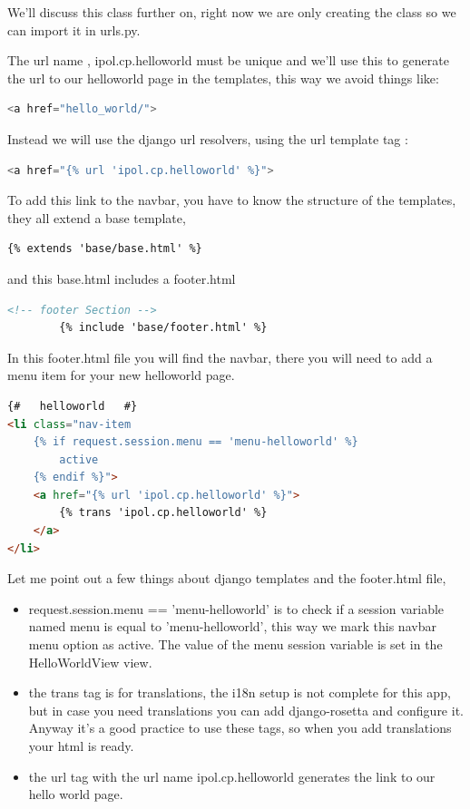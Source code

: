 We'll discuss this class further on, right now we are only creating the class so we can import it in urls.py.

The url name , ipol.cp.helloworld must be unique and we'll use this to generate the url to our helloworld page in the templates, this way we avoid things like: 

\begin{lstlisting}[language=Python,firstnumber=1]
<a href="hello_world/">
\end{lstlisting}

Instead we will use the django url resolvers, using the url template tag :

\begin{lstlisting}[language=Python,firstnumber=1]
<a href="{% url 'ipol.cp.helloworld' %}">
\end{lstlisting}

To add this link to the navbar, you have to know the structure of the templates, they all extend a base template, 

\begin{lstlisting}[language=html,firstnumber=1]
{% extends 'base/base.html' %}
\end{lstlisting}

and this base.html includes a footer.html

\begin{lstlisting}[language=html,firstnumber=1]
        <!-- footer Section -->
        {% include 'base/footer.html' %}
\end{lstlisting}

In this footer.html file you will find the navbar, there you will need to add a menu item for your new helloworld page.

\begin{lstlisting}[language=html,firstnumber=1]
{#   helloworld   #}
<li class="nav-item 
	{% if request.session.menu == 'menu-helloworld' %} 
		active 
	{% endif %}">
	<a href="{% url 'ipol.cp.helloworld' %}">
		{% trans 'ipol.cp.helloworld' %}
	</a>
</li>
\end{lstlisting}

Let me point out a few things about django templates and the footer.html file, 

\begin{itemize}
\item  request.session.menu == 'menu-helloworld' is to check if a session variable named menu
is equal to  'menu-helloworld', this way we mark this navbar menu option as active.
The value of the menu session variable is set in the HelloWorldView view.

\item  the trans tag is for translations, the i18n setup is not complete for this app, but in case you need translations you can add django-rosetta and configure it.
Anyway it's a good practice to use these tags, so when you add translations your html is ready.

\item  the url tag with the url name ipol.cp.helloworld generates the link to our hello world page.

\end{itemize}

